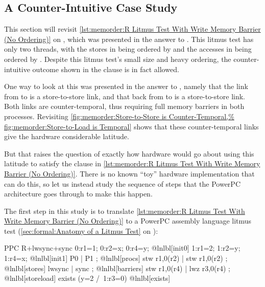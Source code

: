 \subsection{A Counter-Intuitive Case Study}
\label{sec:memorder:A Counter-Intuitive Case Study}

This section will revisit
\cref{lst:memorder:R Litmus Test With Write Memory Barrier (No Ordering)}
on ,
which was presented in the answer to
\QuickQuizARef{\MemorderQQLitmusTestR}.
This litmus test has only two threads, with the stores in 
being ordered by  and the accesses in  being
ordered by .
Despite this litmus test's small size and heavy ordering, the
counter-intuitive outcome shown in the  clause is in fact
allowed.

One way to look at this was presented in the answer to
\QuickQuizARef{\MemorderQQLitmusTestR}, namely that the link from
 to  is a store-to-store link, and that back
from  to  is a store-to-store link.
Both links are counter-temporal, thus requiring full memory barriers
in both processes.
Revisiting
\cref{fig:memorder:Store-to-Store is Counter-Temporal,%
fig:memorder:Store-to-Load is Temporal}
shows that these counter-temporal links give the hardware considerable
latitude.

But that raises the question of exactly how hardware would go about using
this latitude to satisfy the  clause in
\cref{lst:memorder:R Litmus Test With Write Memory Barrier (No Ordering)}.
There is no known ``toy'' hardware implementation that can do this, so
let us instead study the sequence of steps that the PowerPC architecture
goes through to make this happen.

The first step in this study is to translate
\cref{lst:memorder:R Litmus Test With Write Memory Barrier (No Ordering)}
to a PowerPC assembly language litmus test
(\cref{sec:formal:Anatomy of a Litmus Test} on
):

\begin{fcvlabel}
\begin{VerbatimN}[samepage=true,commandchars=\@\[\]]
PPC R+lwsync+sync
{
0:r1=1; 0:r2=x; 0:r4=y;		@lnlbl[init0]
1:r1=2; 1:r2=y; 1:r4=x;		@lnlbl[init1]
}
 P0           | P1           ;	@lnlbl[procs]
 stw r1,0(r2) | stw r1,0(r2) ;	@lnlbl[stores]
 lwsync       | sync         ;	@lnlbl[barriers]
 stw r1,0(r4) | lwz r3,0(r4) ;	@lnlbl[storeload]
exists (y=2 /\ 1:r3=0)		@lnlbl[exists]
\end{VerbatimN}
\end{fcvlabel}

